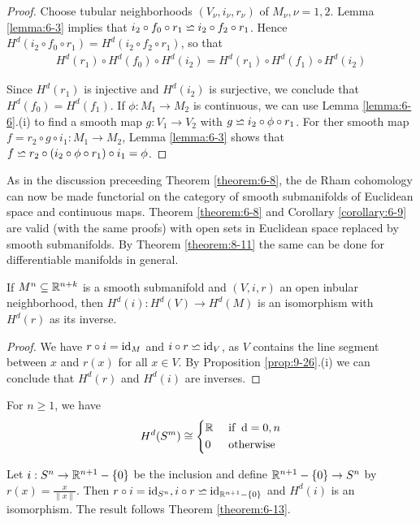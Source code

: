 \begin{proof}
  Choose tubular neighborhoods $(V_\nu, i_\nu, r_\nu)$ of $M_\nu, \nu=1, 2$. Lemma \ref{lemma:6-3}
  implies that $i_2\circ f_0\circ r_1 \backsimeq i_2\circ f_2\circ r_1$. Hence 
  $H^d(i_2\circ f_0\circ r_1) = H^d(i_2\circ f_2\circ r_1)$, so that 
  \begin{align*}
    H^d(r_1)\circ H^d(f_0)\circ H^d(i_2) 
    = H^d(r_1)\circ H^d(f_1)\circ H^d(i_2) 
  \end{align*}

  Since $H^d(r_1)$ is injective and $H^d(i_2)$ is surjective, we conclude that $H^d(f_0)
  = H^d(f_1)$. If $\phi:M_1\to M_2$ is continuous, we can use Lemma \ref{lemma:6-6}.(i) to find 
  a smooth map $g:V_1\to V_2$ with $g\backsimeq i_2\circ \phi\circ r_1$. For ther smooth map $f = r_2\circ g\circ i_1:M_1\to M_2$,
  Lemma \ref{lemma:6-3} shows that $f\backsimeq r_2\circ (i_2\circ \phi\circ r_1)\circ i_1 = \phi$. 
\end{proof}

\begin{remark}\label{remark:9-27}
  As in the discussion preceeding Theorem \ref{theorem:6-8}, the de Rham cohomology 
  can now be made functorial on the category of smooth submanifolds of
  Euclidean space and continuous maps. Theorem \ref{theorem:6-8} and Corollary \ref{corollary:6-9} 
  are valid (with the same proofs) with open sets in Euclidean space replaced by smooth submanifolds. 
  By Theorem \ref{theorem:8-11} the same can be done for differentiable manifolds in general.
\end{remark}

\begin{corollary}\label{corollary:9-28}
  If $M^n\subseteq \mathbb{R}^{n+k}$ is a smooth submanifold and $(V, i, r)$ an open inbular neighborhood, then 
  $H^d(i):H^d(V)\to H^d(M)$ is an isomorphism with $H^d(r)$ as its inverse.
\end{corollary}

\begin{proof}
  We have $r\circ i = \operatorname{id}_M$ and $i\circ r \backsimeq \operatorname{id}_V$, as $V$ contains the line segment
between $x$ and $r(x)$ for all $x\in V$. By Proposition \ref{prop:9-26}.(i) we can conclude
that $H^d(r)$ and $H^d(i)$ are inverses.
\end{proof}

\begin{example}\label{example:9-29}
  For $n\ge 1$, we have 
  \begin{align*}
    H^d(S^m)\simee \left\{\begin{aligned}
      & \RR && \text{ if } \dd = 0, n \\
      & 0 && \text{ otherwise }
    \end{aligned}\right.
  \end{align*}

  Let $i:S^n\to\mathbb{R}^{n+1}-\{0\}$ be the inclusion and define $\mathbb{R}^{n+1}-\{0\}\to S^n$ by 
  $r(x) = \frac{x}{\|x\|}$. Then $r\circ i = \operatorname{id}_{S^n}, i\circ r \backsimeq \operatorname{id}_{\mathbb{R}^{n+1}-\{0\}}$ and 
  $H^d(i)$ is an isomorphism. The result follows Theorem \ref{theorem:6-13}.
\end{example}

